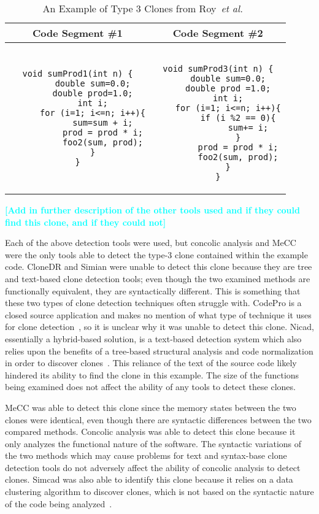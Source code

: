 \documentclass[smallextended]{svjour3}       %
\newcommand{\todo}[1]{\textcolor{cyan}{\textbf{[#1]}}}
\begin{document}
\noindent
\begin{table*}
\centering
\begin{tabular}{c | c}
\bfseries Code Segment \#1  & \bfseries Code Segment \#2 \\ \hline \hline
\begin{lstlisting}
void sumProd1(int n) {
	  double sum=0.0;
	  double prod=1.0;
	  int i;
	  for (i=1; i<=n; i++){
		  sum=sum + i;
		  prod = prod * i;
		  foo2(sum, prod);
	  }
}
\end{lstlisting}
&
\begin{lstlisting}

void sumProd3(int n) {
	double sum=0.0;
	double prod =1.0;
	int i;
	for (i=1; i<=n; i++){
		if (i %2 == 0){
			sum+= i;
		}
		prod = prod * i;
		foo2(sum, prod);
	}
}
\end{lstlisting}

\end{tabular}
\caption{An Example of Type 3 Clones from Roy~\emph{et al.}~\label{table:roy_type3}}
\end{table*}

\todo{Add in further description of the other tools used and if they could find this clone, and if they could not}

Each of the above detection tools were used, but concolic analysis and MeCC were the only tools able to detect the type-3 clone contained within the example code. CloneDR and Simian were unable to detect this clone because they are tree and text-based clone detection tools; even though the two examined methods are functionally equivalent, they are syntactically different. This is something that these two types of clone detection techniques often struggle with. CodePro is a closed source application and makes no mention of what type of technique it uses for clone detection~\cite{Johnson:2013:WDS:2486788.2486877}, so it is unclear why it was unable to detect this clone. Nicad, essentially a hybrid-based solution, is a text-based detection system which also relies upon the benefits of a tree-based structural analysis and code normalization in order to discover clones~\cite{Roy:2009:CEC:1530898.1531101}. This reliance of the text of the source code likely hindered its ability to find the clone in this example. The size of the functions being examined does not affect the ability of any tools to detect these clones.

MeCC was able to detect this clone since the memory states between the two clones were identical, even though there are syntactic differences between the two compared methods. Concolic analysis was able to detect this clone because it only analyzes the functional nature of the software. The syntactic variations of the two methods which may cause problems for text and syntax-base clone detection tools do not adversely affect the ability of concolic analysis to detect clones. Simcad was also able to identify this clone because it relies on a data clustering algorithm to discover clones, which is not based on the syntactic nature of the code being analyzed~\cite{6613857}.
\end{document}
